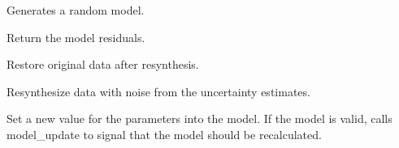 \documentclass[letterpaper,10pt,english]{sphinxmanual}
\begin{document}
\begin{fulllineitems}

\begin{fulllineitems}
\label{api/fitproblem:refl1d.fitproblem.FitProblem.randomize}
Generates a random model.

\end{fulllineitems}


\begin{fulllineitems}
\label{api/fitproblem:refl1d.fitproblem.FitProblem.residuals}
Return the model residuals.

\end{fulllineitems}


\begin{fulllineitems}
\label{api/fitproblem:refl1d.fitproblem.FitProblem.restore_data}
Restore original data after resynthesis.

\end{fulllineitems}


\begin{fulllineitems}
\label{api/fitproblem:refl1d.fitproblem.FitProblem.resynth_data}
Resynthesize data with noise from the uncertainty estimates.

\end{fulllineitems}


\begin{fulllineitems}
\label{api/fitproblem:refl1d.fitproblem.FitProblem.save}
\end{fulllineitems}


\begin{fulllineitems}
\label{api/fitproblem:refl1d.fitproblem.FitProblem.setp}
Set a new value for the parameters into the model.  If the model
is valid, calls model\_update to signal that the model should be
recalculated.


\end{fulllineitems}
\end{fulllineitems}
\end{document}
